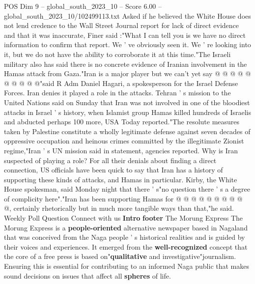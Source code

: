 \begin{textsample}{POS Dim 9 – global\_south\_2023\_10 – Score 6.00 – global\_south\_2023\_10/102499113.txt}
Asked if he believed the White House does not lend credence to the Wall Street Journal report for lack of direct evidence and that it was inaccurate, Finer said :"What I can tell you is we have no direct information to confirm that report.
We ' ve obviously seen it.
We ' re looking into it, but we do not have the ability to corroborate it at this time."The Israeli military also has said there is no concrete evidence of Iranian involvement in the Hamas attack from Gaza."Iran is a major player but we can't yet say @ @ @ @ @ @ @ @ @ @"said R Adm Daniel Hagari, a spokesperson for the Israel Defense Forces.
Iran denies it played a role in the attacks.
Tehran ' s mission to the United Nations said on Sunday that Iran was not involved in one of the bloodiest attacks in Israel ' s history, when Islamist group Hamas killed hundreds of Israelis and abducted perhaps 100 more, USA Today reported."The resolute measures taken by Palestine constitute a wholly legitimate defense against seven decades of oppressive occupation and heinous crimes committed by the illegitimate Zionist regime,"Iran ' s UN mission said in statement, agencies reported.
Why is Iran suspected of playing a role?
For all their denials about finding a direct connection, US officials have been quick to say that Iran has a history of supporting these kinds of attacks, and Hamas in particular.
Kirby, the White House spokesman, said Monday night that there ' s"no question there ' s a degree of complicity here"."Iran has been supporting Hamas for @ @ @ @ @ @ @ @ @ @, certainly rhetorically but in much more tangible ways than that,"he said.
Weekly Poll Question Connect with us \textbf{Intro} \textbf{footer} The Morung Express The Morung Express is a \textbf{people-oriented} alternative newspaper based in Nagaland that was conceived from the Naga people ' s historical realities and is guided by their voices and experiences.
It emerged from the \textbf{well-recognized} concept that the core of a free press is based on"\textbf{qualitative} and investigative"journalism.
Ensuring this is essential for contributing to an informed Naga public that makes sound decisions on issues that affect all \textbf{spheres} of life.

\end{textsample}

